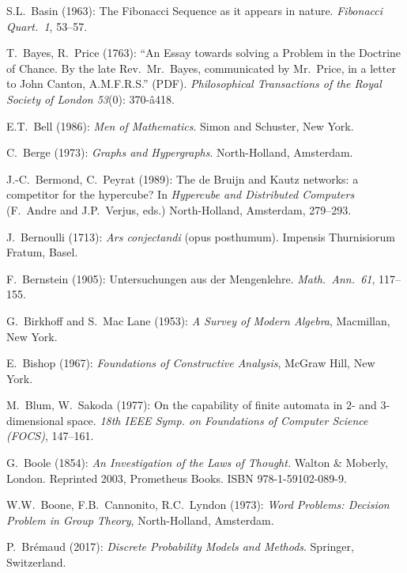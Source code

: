 \begin{thebibliography}{999}

S.L.~Basin (1963): The Fibonacci Sequence as it appears in nature.
{\it Fibonacci Quart.~1}, 53--57.

T.~Bayes, R.~Price (1763): ``An Essay towards solving a
Problem in the Doctrine of Chance.  By the late Rev.~Mr.~Bayes,
communicated by Mr.~Price, in a letter to John Canton,
A.M.F.R.S.'' (PDF).  {\it Philosophical Transactions of the Royal
Society of London 53}(0): 370-â418.

E.T.~Bell (1986):
{\it Men of Mathematics}.
Simon and Schuster, New York.

C.~Berge (1973):
{\it Graphs and Hypergraphs}.
North-Holland, Amsterdam.

J.-C.~Bermond, C.~Peyrat (1989):
The de Bruijn and Kautz networks: a competitor for the hypercube?
In {\it Hypercube and Distributed Computers} (F.~Andre and
J.P.~Verjus, eds.)  North-Holland, Amsterdam, 279--293.

J.~Bernoulli (1713):
{\it Ars conjectandi} (opus posthumum).
Impensis Thurnisiorum Fratum, Basel. 

F.~Bernstein (1905): Untersuchungen aus der Mengenlehre. {\it
Math.~Ann.~61}, 117--155.

G.~Birkhoff and S.~Mac Lane (1953): {\it A Survey of Modern Algebra},
Macmillan, New York.

E.~Bishop (1967): {\it Foundations of Constructive Analysis},
McGraw Hill, New York.

M.~Blum, W.~Sakoda (1977):
On the capability of finite automata in $2$- and $3$- dimensional
space.  {\it 18th IEEE Symp. on Foundations of Computer Science
  (FOCS)}, 147--161.


G.~Boole (1854):
{\it An Investigation of the Laws of Thought.}  
Walton \& Moberly, London.  Reprinted 2003, Prometheus Books. ISBN
978-1-59102-089-9.

W.W.~Boone, F.B.~Cannonito, R.C.~Lyndon (1973):
{\it Word Problems: Decision Problem in Group Theory}, North-Holland,
Amsterdam.

P.~Br\' emaud (2017):
{\it Discrete Probability Models and Methods}.
Springer, Switzerland.


\end{thebibliography}
